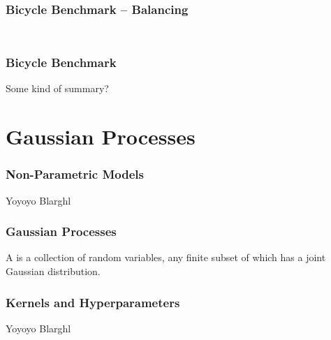 \begin{frame}[label=bicycle_balance]
    \frametitle{Bicycle Benchmark -- Balancing}

    \vfill
    \begin{columns}
        \begin{column}{0.45\textwidth}
            \centering
            
        \end{column}
        \begin{column}{0.55\textwidth}
            \centering
             {
            }
        \end{column}
    \end{columns}
\end{frame}

\begin{frame}[label=bicycle_summary]
    \frametitle{Bicycle Benchmark}

    Some kind of summary?
\end{frame}

\section{Gaussian Processes}
\begin{frame}[label=gp_non_parametric_models]
    \frametitle{Non-Parametric Models}

    \begin{block}{Yoyoyo}
        Blarghl
    \end{block}
    \vfill
    \centering
\end{frame}

\begin{frame}[label=gp_definition]
    \frametitle{Gaussian Processes}

    \begin{definition}
        A  is a collection of random variables, any finite subset of which has a joint Gaussian distribution.
    \end{definition}
\end{frame}

\begin{frame}[label=gp_kernels]
    \frametitle{Kernels and Hyperparameters}

    \begin{block}{Yoyoyo}
        Blarghl
    \end{block}
    \vfill
    \centering
\end{frame}

